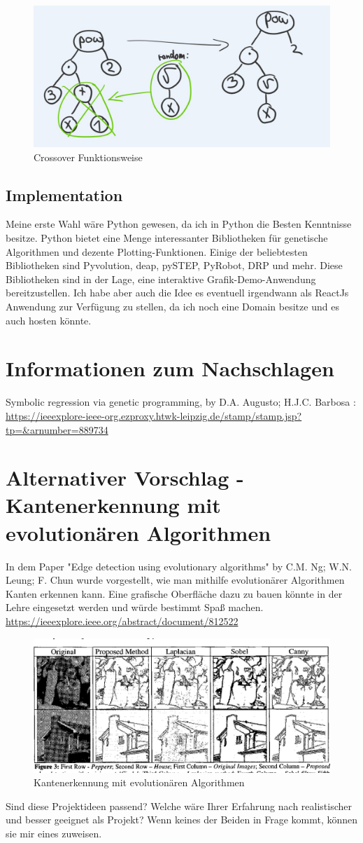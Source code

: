 \documentclass[ngerman]{article}
\begin{document}
\begin{figure}[h]
	\centering
	\includegraphics[width=0.4\linewidth]{mutationswap.jpg}
	\caption{Crossover Funktionsweise}
	\label{fig::mut}
\end{figure}

\subsection{Implementation}
Meine erste Wahl wäre Python gewesen, da ich in Python die Besten Kenntnisse besitze. 
Python  bietet eine Menge interessanter Bibliotheken für genetische Algorithmen und dezente Plotting-Funktionen. Einige der beliebtesten Bibliotheken sind Pyvolution, deap, pySTEP, PyRobot, DRP und mehr. Diese Bibliotheken sind in der Lage, eine interaktive Grafik-Demo-Anwendung bereitzustellen.
Ich habe aber auch die Idee es eventuell irgendwann als ReactJs Anwendung zur Verfügung zu stellen, da ich noch eine Domain besitze und es auch hosten könnte.
\section{Informationen zum Nachschlagen}
Symbolic regression via genetic programming, by D.A. Augusto; H.J.C. Barbosa : 
\url{
	https://ieeexplore-ieee-org.ezproxy.htwk-leipzig.de/stamp/stamp.jsp?tp=&arnumber=889734}


\section{Alternativer Vorschlag - Kantenerkennung mit evolutionären Algorithmen}


In dem Paper "Edge detection using evolutionary algorithms" by C.M. Ng; W.N. Leung; F. Chun wurde vorgestellt, wie man mithilfe evolutionärer Algorithmen Kanten erkennen kann. Eine grafische Oberfläche dazu zu bauen könnte in der Lehre eingesetzt werden und würde bestimmt Spaß machen.  
\url{https://ieeexplore.ieee.org/abstract/document/812522}

\begin{figure}[h]
	\centering
	\includegraphics[width=0.4\linewidth]{geneticcanny.png}
	\caption{Kantenerkennung mit evolutionären Algorithmen}
	\label{fig::can}
\end{figure}

Sind diese Projektideen passend? Welche wäre Ihrer Erfahrung nach realistischer und besser geeignet als Projekt? Wenn keines der Beiden in Frage kommt, können sie mir eines zuweisen.
\end{document}

